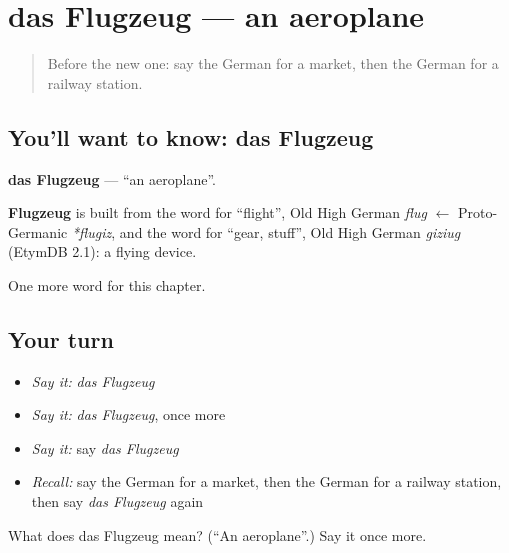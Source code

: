 \section[das Flugzeug]{das Flugzeug — an aeroplane}

\label{lesson:GE-C96-flugzeug}



\begin{quote}
Before the new one: say the German for a market, then the German for a railway station.
\end{quote}

\subsection*{You'll want to know: das Flugzeug}
\textbf{das Flugzeug} — \textquotedblleft{}an aeroplane\textquotedblright{}.

\begin{cousinweb}
\textbf{Flugzeug} is built from the word for \textquotedblleft{}flight\textquotedblright{}, Old High German \emph{flug} $\leftarrow$ Proto-Germanic \emph{*flugiz}, and the word for \textquotedblleft{}gear, stuff\textquotedblright{}, Old High German \emph{giziug} (EtymDB 2.1): a flying device.
\end{cousinweb}

\begin{grammarlens}[title={What you've built}]
One more word for this chapter.
\end{grammarlens}

\subsection*{Your turn}
\begin{itemize}
\raggedright
  \item \emph{Say it:} \emph{das Flugzeug}
  \item \emph{Say it:} \emph{das Flugzeug}, once more
  \item \emph{Say it:} say \emph{das Flugzeug}
  \item \emph{Recall:} say the German for a market, then the German for a railway station, then say \emph{das Flugzeug} again
\end{itemize}

\begin{tcolorbox}[breakable,colback=teal!4,colframe=teal!35!black,title={Before you move on}]
What does das Flugzeug mean? (\textquotedblleft{}An aeroplane\textquotedblright{}.) Say it once more.
\end{tcolorbox}

